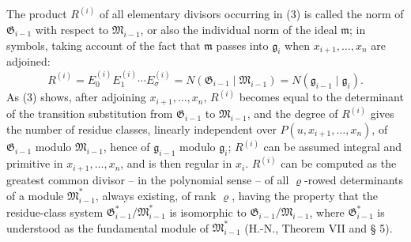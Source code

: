 \documentclass[11pt]{article}
\providecommand{\frakM}{\mathfrak M}
\providecommand{\frakG}{\mathfrak G}
\providecommand{\frakm}{\mathfrak m}
\providecommand{\frakg}{\mathfrak g}
\begin{document}
The product $R^{(i)}$ of all elementary divisors occurring in (3) is called the norm of $\frakG_{i-1}$ with respect to $\frakM_{i-1}$, or also the individual norm of the ideal $\frakm$; in symbols, taking account of the fact that $\frakm$ passes into $\frakg_i$ when $x_{i+1},\ldots,x_n$ are adjoined:
\begin{equation}
 R^{(i)}=E_0^{(i)}E_1^{(i)}\cdots E_\sigma^{(i)}
 =N(\frakG_{i-1}\mid\frakM_{i-1})=N(\frakg_{i-1}\mid\frakg_i).
\end{equation}
As (3) shows, after adjoining $x_{i+1},\ldots,x_n$, $R^{(i)}$ becomes equal to the determinant of the transition substitution from $\frakG_{i-1}$ to $\frakM_{i-1}$, and the degree of $R^{(i)}$ gives the number of residue classes, linearly independent over $P(u,x_{i+1},\ldots,x_n)$, of $\frakG_{i-1}$ modulo $\frakM_{i-1}$, hence of $\frakg_{i-1}$ modulo $\frakg_i$; $R^{(i)}$ can be assumed integral and primitive in $x_{i+1},\ldots,x_n$, and is then regular in $x_i$. $R^{(i)}$ can be computed as the greatest common divisor -- in the polynomial sense -- of all $\varrho$-rowed determinants of a module $\frakM^*_{i-1}$, always existing, of rank $\varrho$, having the property that the residue-class system $\frakG^*_{i-1}/\frakM^*_{i-1}$ is isomorphic to $\frakG_{i-1}/\frakM_{i-1}$, where $\frakG^*_{i-1}$ is understood as the fundamental module of $\frakM^*_{i-1}$ (H.-N., Theorem VII and § 5).
\end{document}
